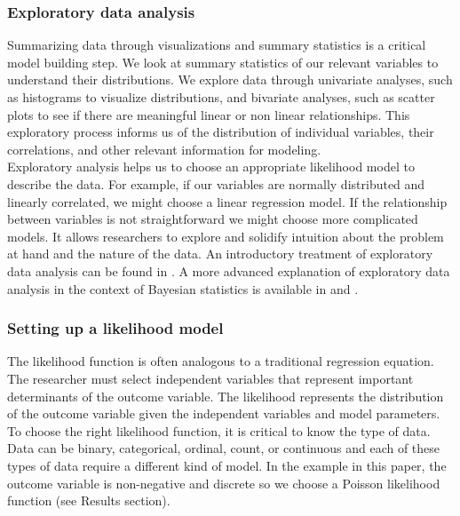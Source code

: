 \documentclass{article}
\begin{document}
\subsubsection{Exploratory data analysis}
Summarizing data through visualizations and summary statistics is a critical model building step. We look at summary statistics of our relevant variables to understand their distributions. We explore data through univariate analyses, such as histograms to visualize distributions, and bivariate analyses, such as scatter plots to see if there are meaningful linear or non linear relationships. This exploratory process informs us of the distribution of individual variables, their correlations, and other relevant information for modeling. \\
Exploratory analysis helps us to choose an appropriate likelihood model to describe the data. For example, if our variables are normally distributed and linearly correlated, we might choose a linear regression model. If the relationship between variables is not straightforward we might choose more complicated models.  It allows researchers to explore and solidify intuition about the problem at hand and the nature of the data. An introductory treatment of exploratory data analysis can be found in . A more advanced explanation of exploratory data analysis in the context of Bayesian statistics is available in  and .

\subsubsection{Setting up a likelihood model}
The likelihood function is often analogous to a traditional regression equation. The researcher must select independent variables that represent important determinants of the outcome variable. The likelihood represents the distribution of the outcome variable given the independent variables and model parameters. To choose the right likelihood function, it is critical to know the type of data. Data can be binary, categorical, ordinal, count, or continuous and each of these types of data require a different kind of model. In the example in this paper, the outcome variable is non-negative and discrete so we choose a Poisson likelihood function (see Results section). 
 
\end{document}
